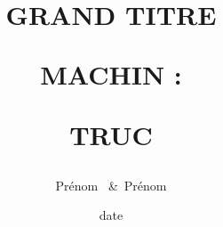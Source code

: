 


\newcommand{\deffunct}[5]{%
\begin{align*}%
      #1 \colon & #2 \to #3\\
       &#4\xmapsto{\hphantom{#1}} #5
\end{align*}%
}
\newcommand*{\HRule}{\rule{\paperwidth}{0.5mm}} %
\newcommand*{\theuniversity}{\'Etablissement}
\newcommand*{\theyearname}{formation, $n$\ieme~année}
\newcommand*{\thesupervisor}{Prénom \bsc{Nom}}

\author{Prénom ~\&~Prénom }
\date{date}
\title{GRAND TITRE\par
            MACHIN : \par TRUC \par}

\DeclareMathOperator{\Card}{Card} %
\newcommand{\Zn}[1][n]{\mathbf{Z}/#1\mathbf{Z}}


\setlrmargins{2.5cm}{*}{*}
\checkandfixthelayout[nearest] %
\renewcommand*{\cftpartaftersnum}{.} %
\renewcommand*{\cftchapteraftersnum}{.}
\renewcommand*{\cftpartdotsep}{\cftdotsep}%
\renewcommand*{\cftchapterdotsep}{\cftdotsep}%
\renewcommand*{\cftappendixname}{\appendixname~} %
